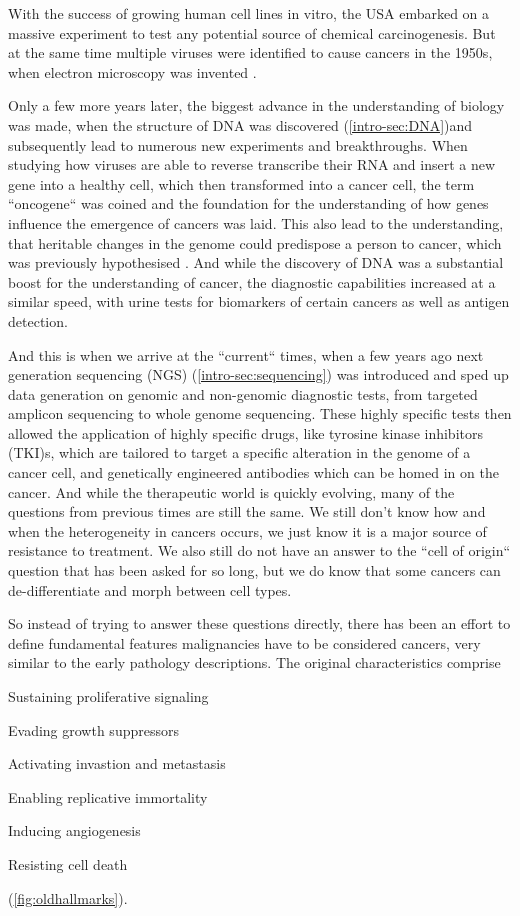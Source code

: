 With the success of growing human cell lines in vitro, the USA embarked on a massive experiment to test any potential source of chemical carcinogenesis. But at the same time multiple viruses were identified to cause cancers in the 1950s, when electron microscopy was invented \cite{Claude1947}.

Only a few more years later, the biggest advance in the understanding of biology was made, when the structure of DNA was discovered \cite{Watson1953} (\autoref{intro-sec:DNA})and subsequently lead to numerous new experiments and breakthroughs. When studying how viruses are able to reverse transcribe their RNA and insert a new gene into a healthy cell, which then transformed into a cancer cell, the term ``oncogene`` was coined\cite{Huebner1969,Baltimore1970,Temin1970} and the foundation for the understanding of how genes influence the emergence of cancers was laid. This also lead to the understanding, that heritable changes in the genome could predispose a person to cancer, which was previously hypothesised \cite{Li1969}. And while the discovery of DNA was a substantial boost for the understanding of cancer, the diagnostic capabilities increased at a similar speed, with urine tests for biomarkers of certain cancers as well as antigen detection.

And this is when we arrive at the ``current`` times, when a few years ago next generation sequencing (NGS) (\autoref{intro-sec:sequencing}) was introduced and sped up data generation on genomic and non-genomic diagnostic tests, from targeted amplicon sequencing to whole genome sequencing. These highly specific tests then allowed the application of highly specific drugs, like tyrosine kinase inhibitors (TKI)s, which are tailored to target a specific alteration in the genome of a cancer cell, and genetically engineered antibodies which can be homed in on the cancer. And while the therapeutic world is quickly evolving, many of the questions from previous times are still the same. We still don't know how and when the heterogeneity in cancers occurs, we just know it is a major source of resistance to treatment. We also still do not have an answer to the ``cell of origin`` question that has been asked for so long, but we do know that some cancers can de-differentiate and morph between cell types.

So instead of trying to answer these questions directly, there has been an effort to define fundamental features malignancies have to be considered cancers, very similar to the early pathology descriptions.  The original characteristics comprise 
\begin{enumerate*}
	\item Sustaining proliferative signaling
	\item Evading growth suppressors
	\item Activating invastion and metastasis
	\item Enabling replicative immortality
	\item Inducing angiogenesis
	\item Resisting cell death
\end{enumerate*} (\autoref{fig:oldhallmarks}). 


